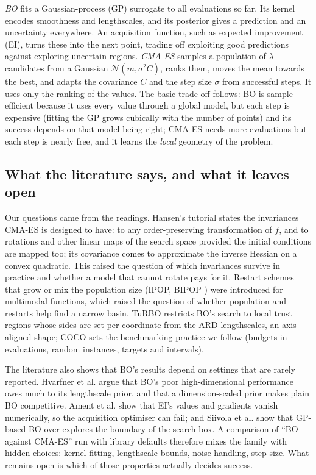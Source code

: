 \documentclass[10pt,a4paper]{article}
\begin{document}
\emph{BO} \citep{frazier2018tutorial} fits a Gaussian-process (GP) surrogate to all evaluations so far. Its
kernel encodes smoothness and lengthscales, and its posterior gives a prediction and an uncertainty everywhere.
An acquisition function, such as expected improvement (EI), turns these into the next point, trading off
exploiting good predictions against exploring uncertain regions. \emph{CMA-ES} \citep{hansen2016tutorial}
samples a population of $\lambda$ candidates from a Gaussian $\mathcal N(m,\sigma^2C)$, ranks them, moves the
mean towards the best, and adapts the covariance $C$ and the step size $\sigma$ from successful steps. It uses
only the ranking of the values. The basic trade-off follows: BO is sample-efficient because it uses every value
through a global model, but each step is expensive (fitting the GP grows cubically with the number of points)
and its success depends on that model being right; CMA-ES needs more evaluations but each step is nearly free,
and it learns the \emph{local} geometry of the problem.

\subsection{What the literature says, and what it leaves open}
Our questions came from the readings. Hansen's tutorial \citep{hansen2016tutorial} states the invariances
CMA-ES is designed to have: to any order-preserving transformation of $f$, and to rotations and other linear
maps of the search space provided the initial conditions are mapped too; its covariance comes to approximate
the inverse Hessian on a convex quadratic. This raised the question of which invariances survive in practice
and whether a model that cannot rotate pays for it. Restart schemes that grow or mix the population size
(IPOP, BIPOP \citep{auger2005ipop,hansen2009bipop}) were introduced for multimodal functions, which raised the
question of whether population and restarts help find a narrow basin. TuRBO \citep{eriksson2019turbo} restricts
BO's search to local trust regions whose sides are set per coordinate from the ARD lengthscales, an axis-aligned
shape;
COCO \citep{hansen2021coco} sets the benchmarking practice we follow (budgets in evaluations, random instances,
targets and intervals).

The literature also shows that BO's results depend on settings that are rarely reported. Hvarfner et al.
\citep{hvarfner2024vanilla} argue that BO's poor high-dimensional performance owes much to its lengthscale
prior, and that a dimension-scaled prior makes plain BO competitive. Ament et al. \citep{ament2023logei} show
that EI's values and gradients vanish numerically, so the acquisition optimiser can fail; and Siivola et al.
\citep{siivola2018boundary} show that GP-based BO over-explores the boundary of the search box. A comparison of
``BO against CMA-ES'' run with library defaults therefore mixes the family with hidden choices: kernel fitting,
lengthscale bounds, noise handling, step size. What remains open is which of those properties actually
decides success.
\end{document}
